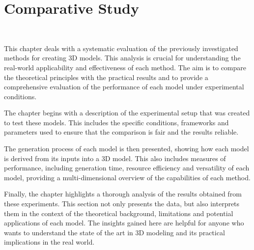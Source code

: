 \chapter{Comparative Study}~\label{ch:comparative study}

This chapter deals with a systematic evaluation of the previously investigated methods for creating 3D models. This analysis is crucial for understanding the real-world applicability and effectiveness of each method. The aim is to compare the theoretical principles with the practical results and to provide a comprehensive evaluation of the performance of each model under experimental conditions.

The chapter begins with a description of the experimental setup that was created to test these models. This includes the specific conditions, frameworks and parameters used to ensure that the comparison is fair and the results reliable. 

The generation process of each model is then presented, showing how each model is derived from its inputs into a 3D model. This also includes measures of performance, including generation time, resource efficiency and versatility of each model, providing a multi-dimensional overview of the capabilities of each method.

Finally, the chapter highlights a thorough analysis of the results obtained from these experiments. This section not only presents the data, but also interprets them in the context of the theoretical background, limitations and potential applications of each model. The insights gained here are helpful for anyone who wants to understand the state of the art in 3D modeling and its practical implications in the real world.




